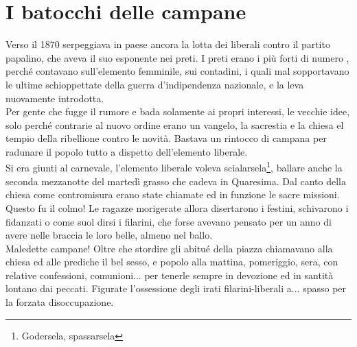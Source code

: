 
\chapter{I batocchi delle campane}
Verso il 1870 serpeggiava in paese ancora la lotta dei liberali contro il partito papalino, che aveva il suo esponente nei preti. I preti erano i più forti di numero , perché contavano sull'elemento femminile, sui contadini, i quali mal sopportavano le ultime schioppettate della guerra d'indipendenza nazionale, e la leva nuovamente introdotta.\\
\indent Per gente che fugge il rumore e bada solamente ai propri interessi, le vecchie idee, solo perché contrarie al nuovo ordine erano un vangelo, la sacrestia e la chiesa el tempio della ribellione contro le novità. Bastava un rintocco di campana per radunare il popolo tutto a dispetto dell'elemento liberale. \\
\indent Si era giunti al carnevale, l'elemento liberale voleva scialarsela\footnote{Godersela, spassarsela}, ballare anche la seconda mezzanotte del martedì grasso che cadeva in Quaresima. Dal canto della chiesa come contromisura erano state chiamate ed in funzione le sacre missioni.\\
\indent Questo fu il colmo! Le ragazze morigerate allora disertarono i festini, schivarono i fidanzati o come suol dirsi i filarini, che forse avevano pensato per un anno di avere nelle braccia le loro belle, almeno nel ballo.\\
\indent Maledette campane! Oltre che stordire gli abitué della piazza chiamavano alla chiesa ed alle prediche il bel sesso, e popolo alla mattina, pomeriggio, sera, con relative confessioni, comunioni... per tenerle sempre in devozione ed in santità lontano dai peccati. Figurate l'ossessione degli irati filarini-liberali a... spasso per la forzata disoccupazione.\\

